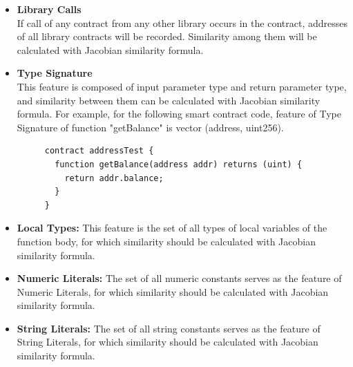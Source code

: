 \begin{itemize}
	\item \textbf{Library Calls} \\ 
	If call of any contract from any other library occurs in the contract, addresses of all library contracts will be recorded. Similarity among them will be calculated with Jacobian similarity formula.
	
	\item \textbf{Type Signature} \\
	This feature is composed of input parameter type and return parameter type, and similarity between them can be calculated with Jacobian similarity formula. For example, for the following smart contract code, feature of Type Signature of function "getBalance" is vector (address, uint256). \\
	
	\begin{figure}[h]
  	\centering
  	\begin{minipage}{.7\linewidth}
	\begin{lstlisting}[frame=single]
contract addressTest {
  function getBalance(address addr) returns (uint) {
  	return addr.balance;
  }
}
	\end{lstlisting}
  	\end{minipage}
	\end{figure}

	\item \textbf{Local Types:} This feature is the set of all types of local variables of the function body, for which similarity should be calculated with Jacobian similarity formula.
	
	\item \textbf{Numeric Literals:} The set of all numeric constants serves as the feature of Numeric Literals, for which similarity should be calculated with Jacobian similarity formula.
	
	\item \textbf{String Literals:} The set of all string constants serves as the feature of String Literals, for which similarity should be calculated with Jacobian similarity formula.
\end{itemize}

